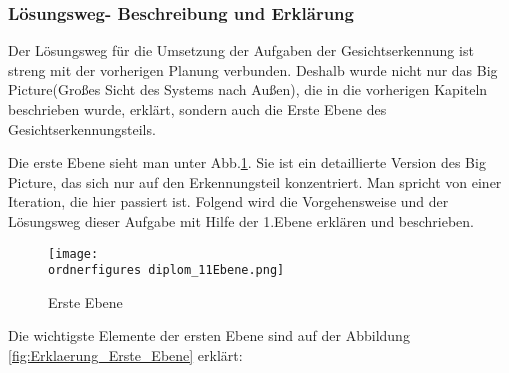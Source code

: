 \subsubsection{Lösungsweg- Beschreibung und Erklärung}
Der Lösungsweg für die Umsetzung der Aufgaben der Gesichtserkennung ist streng mit der vorherigen Planung verbunden. Deshalb wurde nicht nur das Big Picture(Großes Sicht des Systems nach Außen), die in die vorherigen Kapiteln beschrieben wurde, erklärt, sondern auch die Erste Ebene des Gesichtserkennungsteils.


Die erste Ebene sieht man unter Abb.\ref{fig:Erste Ebene}. Sie ist ein detaillierte Version des Big Picture, das sich nur auf den Erkennungsteil konzentriert. Man spricht von einer Iteration, die hier passiert ist.  Folgend wird die Vorgehensweise und der Lösungsweg dieser Aufgabe mit Hilfe der 1.Ebene erklären und beschrieben.\\

\begin{figure}[H]
	\texttt{[image: \\ordnerfigures diplom\_11Ebene.png]}
	\caption{Erste Ebene}
	\label{fig:Erste Ebene}
\end{figure}

Die wichtigste Elemente der ersten Ebene sind auf der Abbildung \ref{fig:Erklaerung_Erste_Ebene} erklärt: \\

